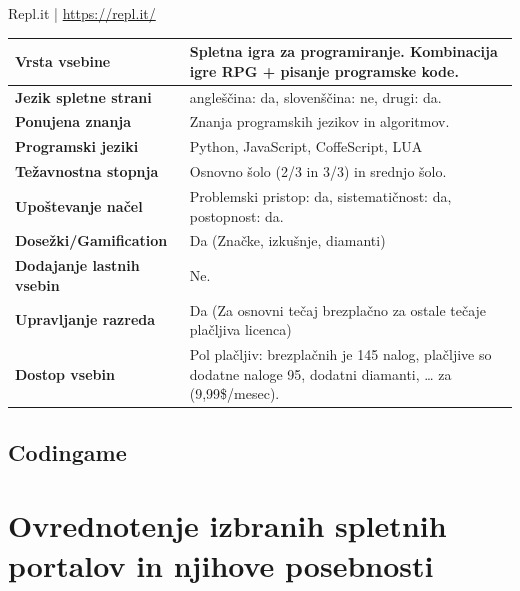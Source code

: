 \begin{osebnabox}[label={osebna:replIT}]{Repl.it | \url{https://repl.it/}}
    \begin{tabular}{
  p{} |
  p{}  }
  \textbf{Vrsta vsebine} & Spletna igra za programiranje. Kombinacija
                           igre RPG + pisanje programske kode. \\
      \hline
  \textbf{Jezik spletne strani} & angleščina: da, slovenščina: ne,
                                  drugi: da. \\
      \hline
  \textbf{Ponujena znanja} & Znanja programskih jezikov in  algoritmov. \\
      \hline
 \textbf{Programski jeziki} & Python, JavaScript, CoffeScript, LUA \\  
      \hline
  \textbf{Težavnostna stopnja} & Osnovno šolo (2/3 in 3/3) in srednjo
                                 šolo. \\ 
      \hline
   \textbf{Upoštevanje načel} & Problemski pristop: da,
                                sistematičnost: da, postopnost: da. \\
      \hline
  \textbf{Dosežki/Gamification} & Da (Značke, izkušnje, diamanti) \\
      \hline
  \textbf{Dodajanje lastnih vsebin} & Ne. \\
      \hline
  \textbf{Upravljanje razreda} & Da (Za osnovni tečaj brezplačno za
                                 ostale tečaje plačljiva licenca) \\ 
      \hline
  \textbf{Dostop vsebin} & Pol plačljiv: brezplačnih je 145 nalog,
                           plačljive so dodatne naloge 95, dodatni
                           diamanti, … za (9,99\$/mesec).   \\  

\end{tabular}
\end{osebnabox}

\subsection{Codingame}
\label{sec:codingame}

\section{Ovrednotenje izbranih spletnih portalov in njihove posebnosti}
\label{sec:pregled_spletnih_portalov}



